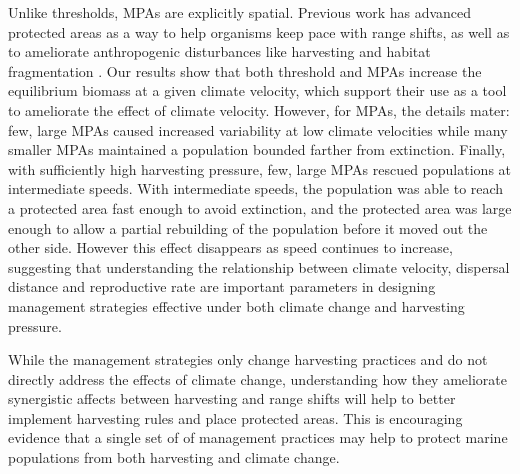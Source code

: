 \documentclass[12pt,english]{article}
\begin{document}
\begin{spacing}{1.9}
\begin{flushleft}
Unlike thresholds, MPAs are explicitly spatial.  Previous work has advanced protected areas as a way to help organisms keep pace with range shifts, as well as to ameliorate anthropogenic disturbances like harvesting and habitat fragmentation \citep{Lawleretal2010, Hannahetal2007,Botsfordetal2001, Gaylordetal2005, HastingsBotsford2003,Thomasetal2012}. Our results show that both threshold and MPAs increase the equilibrium biomass at a given climate velocity, which support their use as a tool to ameliorate the effect of climate velocity. However, for MPAs, the details mater: few, large MPAs caused increased variability at low climate velocities while many smaller MPAs maintained a population bounded farther from extinction. Finally, with sufficiently high harvesting pressure, few, large MPAs rescued populations at intermediate speeds. With intermediate speeds, the population was able to reach a protected area fast enough to avoid extinction, and the protected area was large enough to allow a partial rebuilding of the population before it moved out the other side. However this effect disappears as speed continues to increase, suggesting that understanding the relationship between climate velocity, dispersal distance and reproductive rate are important parameters in designing management strategies effective under both climate change and harvesting pressure. 

While the management strategies only change harvesting practices and do not directly address the effects of climate change, understanding how they ameliorate synergistic affects between harvesting and range shifts will help to better implement harvesting rules and place protected areas.  This is encouraging evidence that a single set of of management practices may help to protect marine populations from both harvesting and climate change.


\end{flushleft}
\end{spacing}
\end{document}
